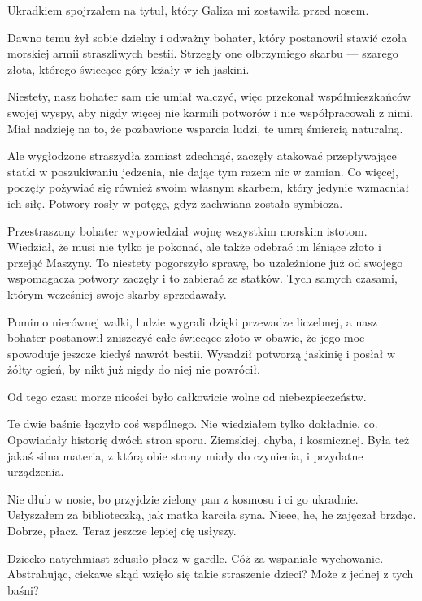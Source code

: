 Ukradkiem spojrzałem na tytuł, który Galiza mi zostawiła przed nosem.

\begin{poem}
	Dawno temu żył sobie dzielny i odważny bohater, który postanowił stawić czoła morskiej armii straszliwych bestii. 
	Strzegły one olbrzymiego skarbu --- szarego złota, którego świecące góry leżały w ich jaskini.
	
	Niestety, nasz bohater sam nie umiał walczyć, więc przekonał współmieszkańców swojej wyspy, aby nigdy więcej nie karmili potworów i nie współpracowali z nimi. 
	Miał nadzieję na to, że pozbawione wsparcia ludzi, te umrą śmiercią naturalną.
	
	Ale wygłodzone straszydła zamiast zdechnąć, zaczęły atakować przepływające statki w poszukiwaniu jedzenia, nie dając tym razem nic w zamian. 
	Co więcej, poczęły pożywiać się również swoim własnym skarbem, który jedynie wzmacniał ich siłę. 
	Potwory rosły w potęgę, gdyż zachwiana została symbioza.
	
	Przestraszony bohater wypowiedział wojnę wszystkim morskim istotom. 
	Wiedział, że musi nie tylko je pokonać, ale także odebrać im lśniące złoto i przejąć Maszyny.
	To niestety pogorszyło sprawę, bo uzależnione już od swojego wspomagacza potwory zaczęły i to zabierać ze statków. 
	Tych samych czasami, którym wcześniej swoje skarby sprzedawały.
	
	Pomimo nierównej walki, ludzie wygrali dzięki przewadze liczebnej, a nasz bohater postanowił zniszczyć całe świecące złoto w obawie, że jego moc spowoduje jeszcze kiedyś nawrót bestii. 
	Wysadził potworzą jaskinię i posłał w żółty ogień, by nikt już nigdy do niej nie powrócił.
	
	Od tego czasu morze nicości było całkowicie wolne od niebezpieczeństw.
\end{poem}

Te dwie baśnie łączyło coś wspólnego. Nie wiedziałem tylko dokładnie, co. Opowiadały historię dwóch stron sporu. Ziemskiej, chyba, i kosmicznej.
Była też jakaś silna materia, z którą obie strony miały do czynienia, i przydatne urządzenia.

\begin{dialogue}
	\ds{} Nie dłub w nosie, bo przyjdzie zielony pan z kosmosu i ci go ukradnie. \dm{} Usłyszałem za biblioteczką, jak matka karciła syna.
	\ds{} Nieee, he, he \dm{} zajęczał brzdąc.
	\ds{} Dobrze, płacz. Teraz jeszcze lepiej cię usłyszy.
\end{dialogue}

Dziecko natychmiast zdusiło płacz w gardle.
Cóż za wspaniałe wychowanie.
Abstrahując, ciekawe skąd wzięło się takie straszenie dzieci? Może z jednej z tych baśni?

